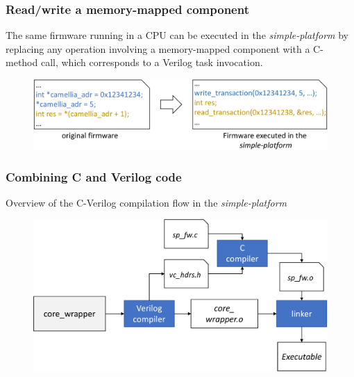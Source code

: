 \documentclass{beamer}
\begin{document}
\begin{frame}

\frametitle{Read/write a memory-mapped component}

The same firmware running in a CPU can be executed in the \textit{simple-platform}
by replacing any operation involving a memory-mapped component with a C-method
call, which corresponds to a Verilog task invocation.

\begin{figure}
	\centering
	\includegraphics[width=0.9\columnwidth]{figures/firmware-crop.pdf}
\end{figure}

\end{frame}


\begin{frame}

\frametitle{Combining C and Verilog code}

Overview of the C-Verilog compilation flow in the \textit{simple-platform}

\begin{figure}
	\centering
	\includegraphics[width=0.9\columnwidth]{figures/c_verilog_flow-crop.pdf}
\end{figure}

\end{frame}
\end{document}
